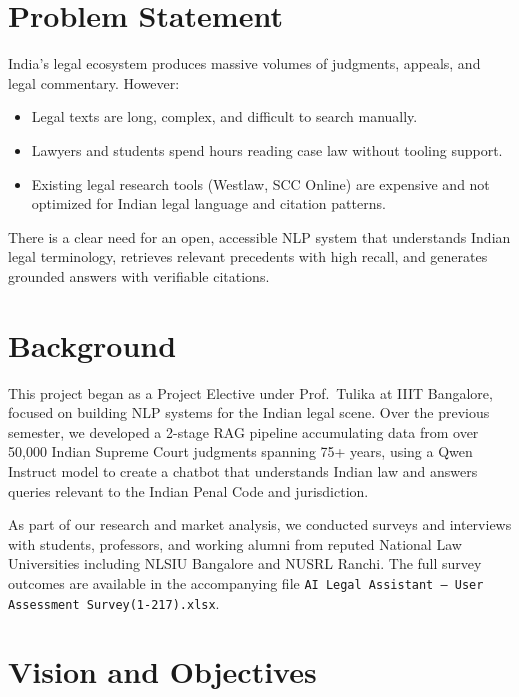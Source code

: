 \documentclass[11pt,a4paper]{article}
\begin{document}
\tableofcontents
\newpage
{}

\section{Problem Statement}

India's legal ecosystem produces massive volumes of judgments, appeals, and
legal commentary. However:

\begin{itemize}[noitemsep]
    \item Legal texts are long, complex, and difficult to search manually.
    \item Lawyers and students spend hours reading case law without tooling
        support.
    \item Existing legal research tools (Westlaw, SCC Online) are expensive
        and not optimized for Indian legal language and citation patterns.
\end{itemize}

There is a clear need for an open, accessible NLP system that understands
Indian legal terminology, retrieves relevant precedents with high recall,
and generates grounded answers with verifiable citations.

\section{Background}

This project began as a Project Elective under Prof.\ Tulika at IIIT
Bangalore, focused on building NLP systems for the Indian legal scene.
Over the previous semester, we developed a 2-stage RAG pipeline
accumulating data from over 50,000 Indian Supreme Court judgments
spanning 75+ years, using a Qwen Instruct model to create a chatbot
that understands Indian law and answers queries relevant to the Indian
Penal Code and jurisdiction.

As part of our research and market analysis, we conducted surveys and
interviews with students, professors, and working alumni from reputed
National Law Universities including NLSIU Bangalore and NUSRL Ranchi.
The full survey outcomes are available in the accompanying file
\texttt{AI Legal Assistant -- User Assessment Survey(1-217).xlsx}.

\section{Vision and Objectives}
\end{document}
